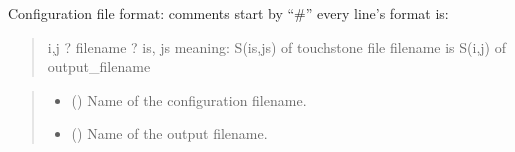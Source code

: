 \documentclass[letterpaper,10pt,english]{sphinxmanual}
\begin{document}
\begin{fulllineitems}
\label{\detokenize{touchstone:touchstone.generate_multiport_spfile}}
\pysigstartsignatures
{}
\pysigstopsignatures
\sphinxAtStartPar
Configuration file format:
\sphinxhyphen{} comments start by “\#”
\sphinxhyphen{} every line’s format is:
\begin{quote}

\sphinxAtStartPar
i,j ? filename ? is, js
meaning:
S(is,js) of touchstone file filename is S(i,j) of output\_filename
\end{quote}
\begin{quote}\begin{description}
\begin{itemize}
\item {}
\sphinxAtStartPar
{} () \textendash{} Name of the configuration filename.

\item {}
\sphinxAtStartPar
{} () \textendash{} Name of the output filename.

\end{itemize}

\end{description}\end{quote}

\end{fulllineitems}


\begin{fulllineitems}
\label{\detokenize{touchstone:touchstone.parse_format}}
\pysigstartsignatures
{}
\pysigstopsignatures
\end{fulllineitems}

\end{document}
